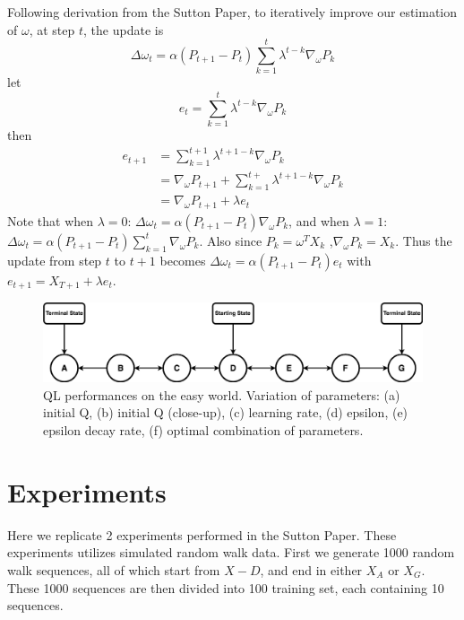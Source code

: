 \documentclass[10pt]{article}
\begin{document}
Following derivation from the Sutton Paper, to iteratively improve our estimation of $\omega$, at step $t$, the update is 
$$\Delta\omega_t=\alpha(P_{t+1}-P_t)\sum_{k=1}^t\lambda^{t-k}\nabla_\omega P_k$$
let
$$e_t=\sum_{k=1}^t\lambda^{t-k}\nabla_\omega P_k$$
then
$$
\begin{aligned}
e_{t+1}&=\sum_{k=1}^{t+1}\lambda^{t+1-k}\nabla_\omega P_k \\
&=\nabla_\omega P_{t+1}+\sum_{k=1}^{t+}\lambda^{t+1-k}\nabla_\omega P_k \\
&=\nabla_\omega P_{t+1}+\lambda e_t
\end{aligned}
$$
Note that when $\lambda=0$: $\Delta\omega_t=\alpha(P_{t+1}-P_t)\nabla_\omega P_k$, and when $\lambda=1$: $\Delta\omega_t=\alpha(P_{t+1}-P_t)\sum_{k=1}^t\nabla_\omega P_k$. Also since $P_k=\omega^TX_k$ ,$\nabla_\omega P_k=X_k$. Thus the update from step $t$ to $t+1$ becomes $\Delta\omega_t=\alpha(P_{t+1}-P_t)e_t$ with $e_{t+1}=X_{T+1}+\lambda e_t$.



\begin{figure}[h!]
  \centering
  \includegraphics[width=\linewidth]{../problem/randomwalk.png}
    \caption{QL performances on the easy world. Variation of parameters: (a) initial Q, (b) initial Q (close-up), (c) learning rate, (d) epsilon, (e) epsilon decay rate, (f) optimal combination of parameters.}
  \label{fig:fig2}
\end{figure}


\section{Experiments} \label{experiments}
Here we replicate 2 experiments performed in the Sutton Paper. These experiments utilizes simulated random walk data. First we generate 1000 random walk sequences, all of which start from $X-D$, and end in either $X_A$ or $X_G$. These 1000 sequences are then divided into 100 training set, each containing 10 sequences.

\par

\end{document}
